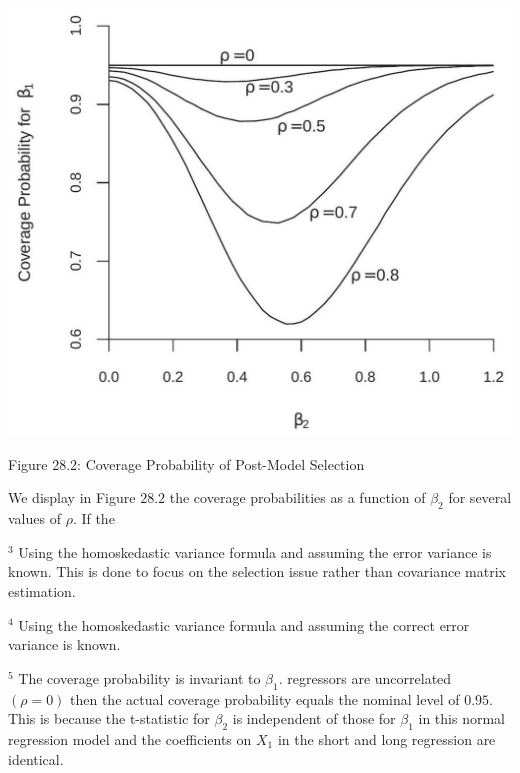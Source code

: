 \documentclass[10pt]{article}
\begin{document}
\includegraphics[max width=\textwidth]{2022_10_23_101d59f261a704807a3bg-24}

Figure 28.2: Coverage Probability of Post-Model Selection

We display in Figure $28.2$ the coverage probabilities as a function of $\beta_{2}$ for several values of $\rho$. If the

${ }^{3}$ Using the homoskedastic variance formula and assuming the error variance is known. This is done to focus on the selection issue rather than covariance matrix estimation.

${ }^{4}$ Using the homoskedastic variance formula and assuming the correct error variance is known.

${ }^{5}$ The coverage probability is invariant to $\beta_{1}$. regressors are uncorrelated $(\rho=0)$ then the actual coverage probability equals the nominal level of $0.95$. This is because the t-statistic for $\beta_{2}$ is independent of those for $\beta_{1}$ in this normal regression model and the coefficients on $X_{1}$ in the short and long regression are identical.
\end{document}
